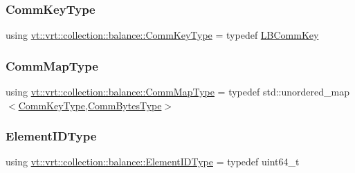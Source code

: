 \mbox{\label{namespacevt_1_1vrt_1_1collection_1_1balance_a01c9a1060d83d052604a3ff12918033a}} 
\subsubsection{\texorpdfstring{Comm\+Key\+Type}{CommKeyType}}
{\footnotesize\ttfamily using \hyperlink{namespacevt_1_1vrt_1_1collection_1_1balance_a01c9a1060d83d052604a3ff12918033a}{vt\+::vrt\+::collection\+::balance\+::\+Comm\+Key\+Type} = typedef \hyperlink{structvt_1_1vrt_1_1collection_1_1balance_1_1_l_b_comm_key}{L\+B\+Comm\+Key}}

\mbox{\label{namespacevt_1_1vrt_1_1collection_1_1balance_aa50d4cbbfa3c643e7303fc6e08f411fb}} 
\subsubsection{\texorpdfstring{Comm\+Map\+Type}{CommMapType}}
{\footnotesize\ttfamily using \hyperlink{namespacevt_1_1vrt_1_1collection_1_1balance_aa50d4cbbfa3c643e7303fc6e08f411fb}{vt\+::vrt\+::collection\+::balance\+::\+Comm\+Map\+Type} = typedef std\+::unordered\+\_\+map$<$\hyperlink{namespacevt_1_1vrt_1_1collection_1_1balance_a01c9a1060d83d052604a3ff12918033a}{Comm\+Key\+Type},\hyperlink{namespacevt_1_1vrt_1_1collection_1_1balance_a0772d7dd137393e9874b9f8caa96d420}{Comm\+Bytes\+Type}$>$}

\mbox{\label{namespacevt_1_1vrt_1_1collection_1_1balance_a14c8d2c972f2913aa3f1636e5be0a120}} 
\subsubsection{\texorpdfstring{Element\+I\+D\+Type}{ElementIDType}}
{\footnotesize\ttfamily using \hyperlink{namespacevt_1_1vrt_1_1collection_1_1balance_a14c8d2c972f2913aa3f1636e5be0a120}{vt\+::vrt\+::collection\+::balance\+::\+Element\+I\+D\+Type} = typedef uint64\+\_\+t}

